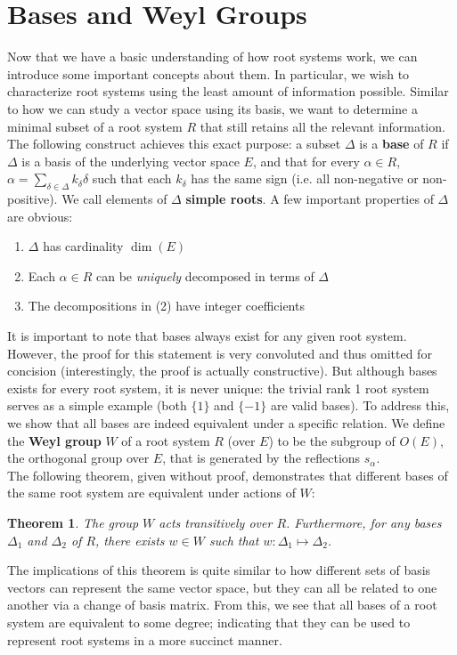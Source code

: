 \documentclass{article}
\newtheorem{theorem}{Theorem}
\theoremstyle{definition}
\begin{document}
\section{Bases and Weyl Groups}
\quad Now that we have a basic understanding of how root systems work, we can introduce some important concepts about them. In particular, we wish to characterize root systems using the least amount of information possible. Similar to how we can study a vector space using its basis, we want to determine a minimal subset of a root system $R$ that still retains all the relevant information. The following construct achieves this exact purpose: a subset $\Delta$ is a \textbf{base} of $R$ if $\Delta$ is a basis of the underlying vector space $E$, and that for every $\alpha\in R$, $\alpha=\sum_{\delta\in\Delta}k_\delta\delta$ such that each $k_\delta$ has the same sign (i.e. all non-negative or non-positive). We call elements of $\Delta$ \textbf{simple roots}. A few important properties of $\Delta$ are obvious: 
\begin{enumerate}
    \item $\Delta$ has cardinality $\dim(E)$
    \item Each $\alpha\in R$ can be \textit{uniquely} decomposed in terms of $\Delta$
    \item The decompositions in (2) have integer coefficients
\end{enumerate}
\quad It is important to note that bases always exist for any given root system. However, the proof for this statement is very convoluted and thus omitted for concision (interestingly, the proof is actually constructive). But although bases exists for every root system, it is never unique: the trivial rank 1 root system serves as a simple example (both $\{1\}$ and $\{-1\}$ are valid bases). To address this, we show that all bases are indeed equivalent under a specific relation. We define the \textbf{Weyl group} $W$ of a root system $R$ (over $E$) to be the subgroup of $O(E)$, the orthogonal group over $E$, that is generated by the reflections $s_\alpha$. \\

The following theorem, given without proof, demonstrates that different bases of the same root system are equivalent under actions of $W$: 
\begin{theorem}
The group $W$ acts transitively over $R$. Furthermore, for any bases $\Delta_1$ and $\Delta_2$ of $R$, there exists $w\in W$ such that $w:\Delta_1\mapsto\Delta_2$. 
\end{theorem}
The implications of this theorem is quite similar to how different sets of basis vectors can represent the same vector space, but they can all be related to one another via a change of basis matrix. From this, we see that all bases of a root system are equivalent to some degree; indicating that they can be used to represent root systems in a more succinct manner. 
\end{document}
